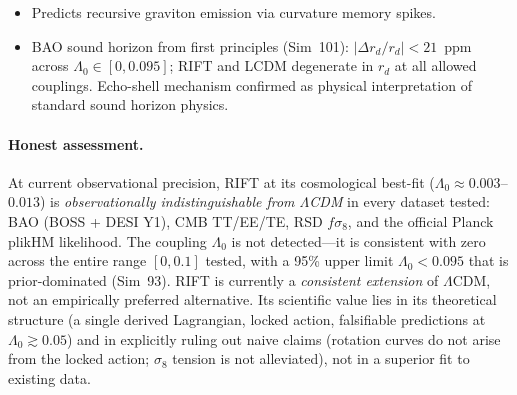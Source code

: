 \documentclass[12pt,a4paper]{article}
\begin{document}
\begin{itemize}
  \item Predicts recursive graviton emission via curvature memory spikes.
  \item BAO sound horizon from first principles (Sim~101): $|\Delta r_d/r_d| < 21$~ppm across $\Lambda_0 \in [0, 0.095]$; RIFT and LCDM degenerate in $r_d$ at all allowed couplings. Echo-shell mechanism confirmed as physical interpretation of standard sound horizon physics.
\end{itemize}

\paragraph{Honest assessment.}
At current observational precision, RIFT at its cosmological best-fit
($\Lambda_0 \approx 0.003$--$0.013$) is \emph{observationally indistinguishable
from $\Lambda$CDM} in every dataset tested: BAO (BOSS + DESI Y1), CMB TT/EE/TE,
RSD $f\sigma_8$, and the official Planck plikHM likelihood.  The coupling
$\Lambda_0$ is not detected---it is consistent with zero across the entire
range $[0, 0.1]$ tested, with a 95\% upper limit $\Lambda_0 < 0.095$ that
is prior-dominated (Sim~93).  RIFT is currently a \emph{consistent extension}
of $\Lambda$CDM, not an empirically preferred alternative.  Its scientific
value lies in its theoretical structure (a single derived Lagrangian, locked
action, falsifiable predictions at $\Lambda_0 \gtrsim 0.05$) and in explicitly
ruling out naive claims (rotation curves do not arise from the locked action;
$\sigma_8$ tension is not alleviated), not in a superior fit to existing data.
\end{document}
